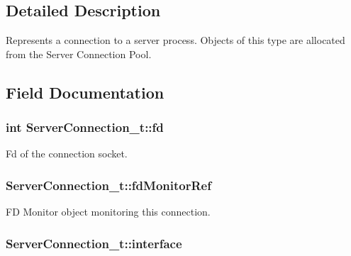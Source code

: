 \subsection{Detailed Description}
Represents a connection to a server process. Objects of this type are allocated from the Server Connection Pool. 

\subsection{Field Documentation}
\subsubsection[{\texorpdfstring{fd}{fd}}]{\setlength{\rightskip}{0pt plus 5cm}int Server\+Connection\+\_\+t\+::fd}\hypertarget{struct_server_connection__t_ac41dae8d857e9f93f971b47cf300c88c}{}\label{struct_server_connection__t_ac41dae8d857e9f93f971b47cf300c88c}


Fd of the connection socket. 

\subsubsection[{\texorpdfstring{fd\+Monitor\+Ref}{fdMonitorRef}}]{ Server\+Connection\+\_\+t\+::fd\+Monitor\+Ref}\hypertarget{struct_server_connection__t_adfd17f6c6d6e498ce1b27b4dd803d5e4}{}\label{struct_server_connection__t_adfd17f6c6d6e498ce1b27b4dd803d5e4}


FD Monitor object monitoring this connection. 

\subsubsection[{\texorpdfstring{interface}{interface}}]{ Server\+Connection\+\_\+t\+::interface}\hypertarget{struct_server_connection__t_a85bb27f0f25c32be0eec56e2d9f588ec}{}\label{struct_server_connection__t_a85bb27f0f25c32be0eec56e2d9f588ec}


